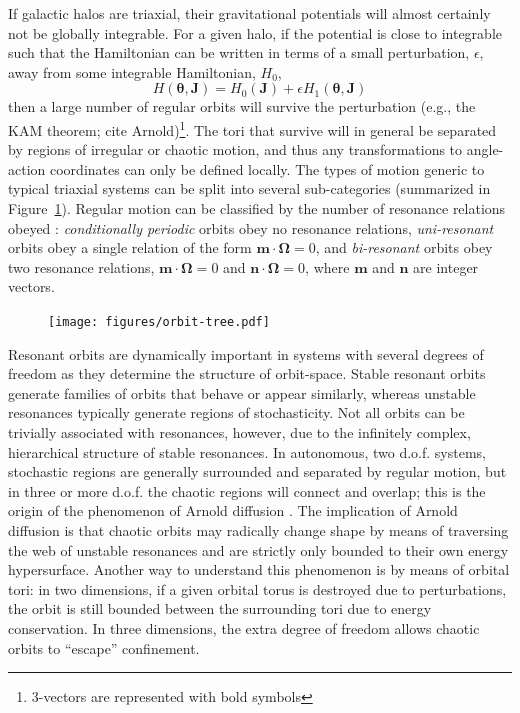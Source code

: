 \documentclass[letterpaper,12pt,preprint]{aastex}
\newcommand{\bs}[1]{\boldsymbol{#1}}
\newcommand{\act}{J}
\begin{document}
If galactic halos are triaxial, their gravitational potentials will almost certainly not be globally integrable. For a given halo, if the potential is close to integrable such that the Hamiltonian can be written in terms of a small perturbation, $\epsilon$, away from some integrable Hamiltonian, $H_0$,
\begin{equation}
	H(\bs{\theta}, \bs{\act}) = H_0(\bs{\act}) + \epsilon H_1(\bs{\theta}, \bs{\act})
\end{equation}
then a large number of regular orbits will survive the perturbation (e.g., the KAM theorem; cite Arnold)\footnote{3-vectors are represented with bold symbols}. The tori that survive will in general be separated by regions of irregular or chaotic motion, and thus any transformations to angle-action coordinates can only be defined locally. The types of motion generic to typical triaxial systems can be split into several sub-categories (summarized in Figure~\ref{fig:orbit-tree}). Regular motion can be classified by the number of resonance relations obeyed \citep[e.g.,][]{lichtenberg83, valluri98}: \emph{conditionally periodic} orbits obey no resonance relations, \emph{uni-resonant} orbits obey a single relation of the form $\bs{m}\cdot\bs{\Omega}=0$, and \emph{bi-resonant} orbits obey two resonance relations, $\bs{m}\cdot\bs{\Omega}=0$ and $\bs{n}\cdot\bs{\Omega}=0$, where $\bs{m}$ and $\bs{n}$ are integer vectors.

\begin{figure}[!h]
\begin{center}
\texttt{[image: figures/orbit-tree.pdf]}
\caption{} \label{fig:orbit-tree}
\end{center}
\end{figure}

Resonant orbits are dynamically important in systems with several degrees of freedom as they determine the structure of orbit-space. Stable resonant orbits generate families of orbits that behave or appear similarly, whereas unstable resonances typically generate regions of stochasticity. Not all orbits can be trivially associated with resonances, however, due to the infinitely complex, hierarchical structure of stable resonances. In autonomous, two d.o.f. systems, stochastic regions are generally surrounded and separated by regular motion, but in three or more d.o.f. the chaotic regions will connect and overlap; this is the origin of the phenomenon of Arnold diffusion \citep{arnold79}. The implication of Arnold diffusion is that chaotic orbits may radically change shape by means of traversing the web of unstable resonances and are strictly only bounded to their own energy hypersurface. Another way to understand this phenomenon is by means of orbital tori: in two dimensions, if a given orbital torus is destroyed due to perturbations, the orbit is still bounded between the surrounding tori due to energy conservation. In three dimensions, the extra degree of freedom allows chaotic orbits to ``escape'' confinement.
\end{document}
